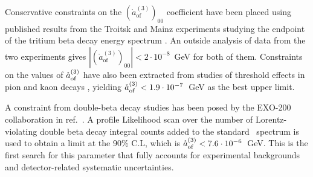 Conservative constraints on the $(\mathring{a}^{(3)}_\text{of})_{00}$
coefficient have been placed using published results from the Troitsk and Mainz
experiments studying the endpoint of the tritium beta decay energy spectrum
\cite{Diaz:2013saa}. An outside analysis of data from the two experiments gives
$|(\mathring{a}^{(3)}_\text{of})_{00}|<2\cdot10^{-8}$~GeV for both of them.
Constraints on the values of $\mathring{a}_\text{of}^{(3)}$ have also been extracted from studies of
threshold effects in pion and kaon decays \cite{SMEneutrinos}, yielding
$\mathring{a}_\text{of}^{(3)}<1.9\cdot10^{-7}$~GeV as the best upper limit.

A constraint from double-beta decay studies has been posed by the EXO-200
collaboration in ref.~\cite{exo200}. A profile Likelihood scan over the number
of Lorentz-violating double beta decay integral counts added to the standard
\nnbb\ spectrum is used to obtain a limit at the 90\% C.L, which is
$\mathring{a}_\text{of}^{(3)}<7.6\cdot10^{-6}$~GeV. This is the first search for this parameter that
fully accounts for experimental backgrounds and detector-related systematic
uncertainties.
